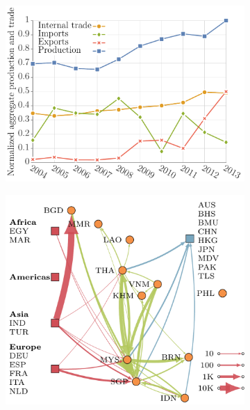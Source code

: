 \documentclass[11pt]{article}
\theoremstyle{definition}
\begin{document}
\begin{figure}[ht]
\centering
\begin{subfigure}[b]{.45\textwidth}
    \includegraphics[width=\textwidth]
    {../international_trade/results/stat_plots/trends.pdf}
    \caption{\label{fig:trends}}
\end{subfigure}\hspace{.5cm} 
\begin{subfigure}[b]{.45\textwidth}
    \includegraphics[width=\textwidth]{../international_trade/results/network_plots/sea_2013_tomato.pdf}
    \caption{\label{fig:tomnet}}

\end{subfigure}
\end{figure}
\end{document}
